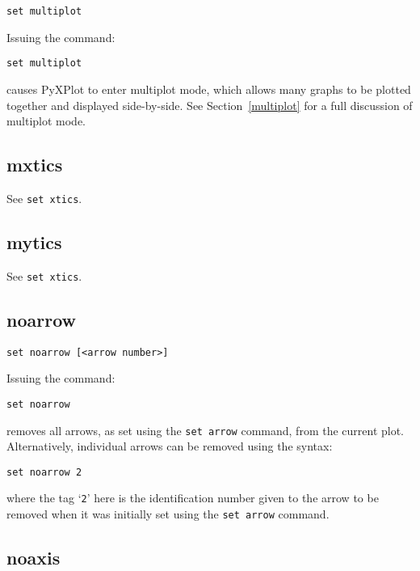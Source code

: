 \documentclass[a4paper,onecolumn,11pt]{book}
\begin{document}
\begin{verbatim}
set multiplot
\end{verbatim}

Issuing the command:

\begin{verbatim}
set multiplot
\end{verbatim}

\noindent causes PyXPlot to enter multiplot mode, which allows many graphs to
be plotted together and displayed side-by-side. See Section~\ref{multiplot} for
a full discussion of multiplot mode.

\subsection{mxtics}

See {\tt set xtics}.

\subsection{mytics}

See {\tt set xtics}.

\subsection{noarrow}

\begin{verbatim}
set noarrow [<arrow number>]
\end{verbatim}

Issuing the command:

\begin{verbatim}
set noarrow
\end{verbatim}

\noindent removes all arrows, as set using the {\tt set arrow} command, from the current
plot. Alternatively, individual arrows can be removed using the syntax:

\begin{verbatim}
set noarrow 2
\end{verbatim}

\noindent where the tag `{\tt 2}' here is the identification number given to
the arrow to be removed when it was initially set using the {\tt set arrow}
command.

\subsection{noaxis}
\end{document}
